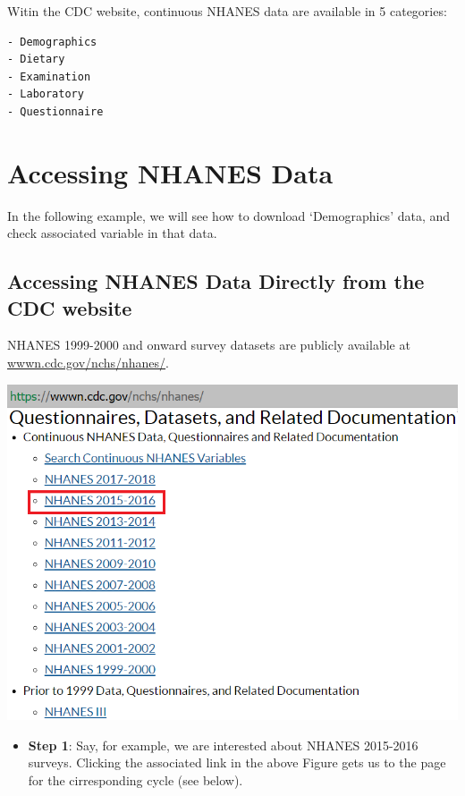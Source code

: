 \documentclass[
]{book}
\providecommand{\tightlist}{%
  \setlength{\itemsep}{0pt}\setlength{\parskip}{0pt}}
\begin{document}
Witin the CDC website, continuous NHANES data are available in 5 categories:

\begin{verbatim}
- Demographics
- Dietary
- Examination
- Laboratory
- Questionnaire
\end{verbatim}

\hypertarget{accessing-nhanes-data}{%
\section{Accessing NHANES Data}\label{accessing-nhanes-data}}

In the following example, we will see how to download `Demographics' data, and check associated variable in that data.

\hypertarget{accessing-nhanes-data-directly-from-the-cdc-website}{%
\subsection{Accessing NHANES Data Directly from the CDC website}\label{accessing-nhanes-data-directly-from-the-cdc-website}}

NHANES 1999-2000 and onward survey datasets are publicly available at \href{https://wwwn.cdc.gov/nchs/nhanes/}{wwwn.cdc.gov/nchs/nhanes/}.

\includegraphics[width=0.65\linewidth]{images/n15}

\begin{itemize}
\tightlist
\item
  \textbf{Step 1}: Say, for example, we are interested about NHANES 2015-2016 surveys. Clicking the associated link in the above Figure gets us to the page for the cirresponding cycle (see below).
\end{itemize}
\end{document}
